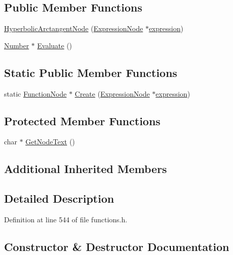 \subsection*{Public Member Functions}
\begin{DoxyCompactItemize}
\item 
\hyperlink{classHyperbolicArctangentNode_a4e4d9e88d6c095754631e325318e517a}{Hyperbolic\+Arctangent\+Node} (\hyperlink{classExpressionNode}{Expression\+Node} $\ast$\hyperlink{classFunctionNode_ad7577b179a1937aaf8a0058bb5b546dc}{expression})
\item 
\hyperlink{structNumber}{Number} $\ast$ \hyperlink{classHyperbolicArctangentNode_abd0bcfeba3e6c349955f1b149e813177}{Evaluate} ()
\end{DoxyCompactItemize}
\subsection*{Static Public Member Functions}
\begin{DoxyCompactItemize}
\item 
static \hyperlink{classFunctionNode}{Function\+Node} $\ast$ \hyperlink{classHyperbolicArctangentNode_ac18a119c5ad51586132840b788cfff21}{Create} (\hyperlink{classExpressionNode}{Expression\+Node} $\ast$\hyperlink{classFunctionNode_ad7577b179a1937aaf8a0058bb5b546dc}{expression})
\end{DoxyCompactItemize}
\subsection*{Protected Member Functions}
\begin{DoxyCompactItemize}
\item 
char $\ast$ \hyperlink{classHyperbolicArctangentNode_ab0f196a5e39dc14a3659e4e65bf1da87}{Get\+Node\+Text} ()
\end{DoxyCompactItemize}
\subsection*{Additional Inherited Members}


\subsection{Detailed Description}


Definition at line 544 of file functions.\+h.



\subsection{Constructor \& Destructor Documentation}
